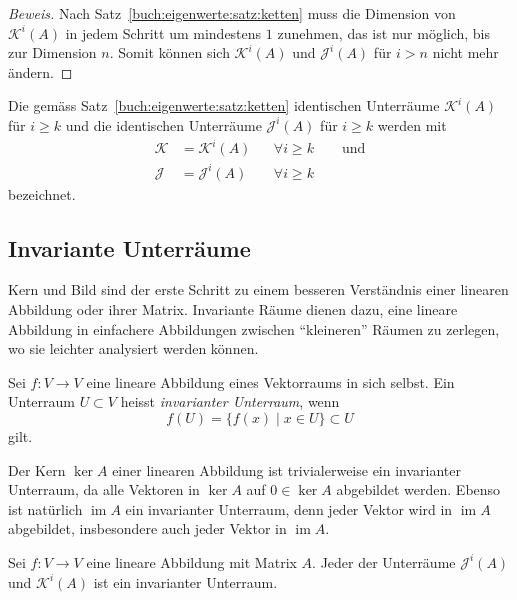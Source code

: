 \begin{proof}[Beweis]
Nach Satz~\ref{buch:eigenwerte:satz:ketten} muss die
Dimension von $\mathcal{K}^i(A)$ in jedem Schritt um mindestens
$1$ zunehmen, das ist nur möglich, bis zur Dimension $n$.
Somit können sich $\mathcal{K}^i(A)$ und $\mathcal{J}^i(A)$ für $i>n$
nicht mehr ändern.
\end{proof}

\begin{definition}
\label{buch:eigenwerte:def:KundJ}
Die gemäss Satz~\ref{buch:eigenwerte:satz:ketten} identischen Unterräume
$\mathcal{K}^i(A)$ für $i\ge k$ und die identischen Unterräume
$\mathcal{J}^i(A)$ für $i\ge k$ werden mit
\[
\begin{aligned}
\mathcal{K} &= \mathcal{K}^i(A)&&\forall i\ge k \qquad\text{und}
\\
\mathcal{J} &= \mathcal{J}^i(A)&&\forall i\ge k
\end{aligned}
\]
bezeichnet.
\end{definition}

%
%
\subsection{Invariante Unterräume
\label{buch:subsection:invariante-unterraeume}}
Kern und Bild sind der erste Schritt zu einem besseren Verständnis 
einer linearen Abbildung oder ihrer Matrix.
Invariante Räume dienen dazu, eine lineare Abbildung in einfachere
Abbildungen zwischen ``kleineren'' Räumen zu zerlegen, wo sie leichter
analysiert werden können.

\begin{definition}
Sei $f\colon V\to V$ eine lineare Abbildung eines Vektorraums in sich
selbst.
Ein Unterraum $U\subset V$ heisst {\em invarianter Unterraum},
wenn
\[
f(U) = \{ f(x)\;|\; x\in U\} \subset U
\]
gilt.
\end{definition}

Der Kern $\ker A$  einer linearen Abbildung ist trivialerweise ein
invarianter Unterraum, da alle Vektoren in $\ker A$ auf $0\in\ker A$
abgebildet werden.
Ebenso ist natürlich $\operatorname{im}A$ ein invarianter Unterraum,
denn jeder Vektor wird in $\operatorname{im}A$ abgebildet, insbesondere
auch jeder Vektor in $\operatorname{im}A$.

\begin{satz}
\label{buch:eigenwerte:satz:KJinvariant}
Sei $f\colon V\to V$ eine lineare Abbildung mit Matrix $A$.
Jeder der Unterräume $\mathcal{J}^i(A)$ und $\mathcal{K}^i(A)$ 
ist ein invarianter Unterraum.
\end{satz}

